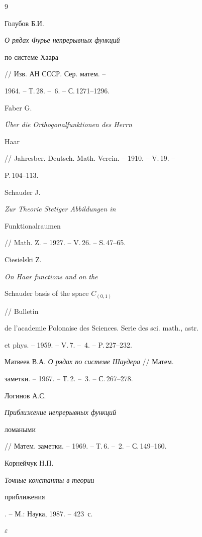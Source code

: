 \begin{thebibliography}{9}







Голубов Б.И. {\em О рядах Фурье непрерывных функций


по системе Хаара} // Изв. АН СССР. Сер. матем. --


1964. -- Т.\,28. -- \No\,6. -- С.\,1271--1296.




Faber G. {\em \"Uber die Orthogonalfunktionen des Herrn


Haar} // Jahresber. Deutsch. Math. Verein. -- 1910. -- V.\,19. --


P.\,104--113.




Schauder J. {\em Zur Theorie Stetiger Abbildungen in


Funktionalraumen} // Math. Z. -- 1927. -- V.\,26. -- S.\,47--65.




Ciesielski Z. {\em On Haar functions and on the


Schauder basis of the space $C_{(0,1)}$} // Bulletin


de l'academie Polonaise des Sciences. Serie des sci. math., astr.


et phys. -- 1959. -- V.\,7. -- \No\,4. -- P.\,227--232.




Матвеев В.А. {\em О рядах по системе Шаудера} // Матем.


заметки. -- 1967. -- Т.\,2. -- \No\,3. -- С.\,267--278.




Логинов А.С. {\em Приближение непрерывных функций


ломаными} // Матем. заметки. -- 1969. -- Т.\,6. -- \No\,2. -- С.\,149--160.




Корнейчук Н.П. {\em Точные константы в теории


приближения}. -- М.: Наука, 1987. -- 423~с.








\end{thebibliography}





\vskip 2cm












\label{end}








 \mbox{\LARGE{$\varepsilon$}}